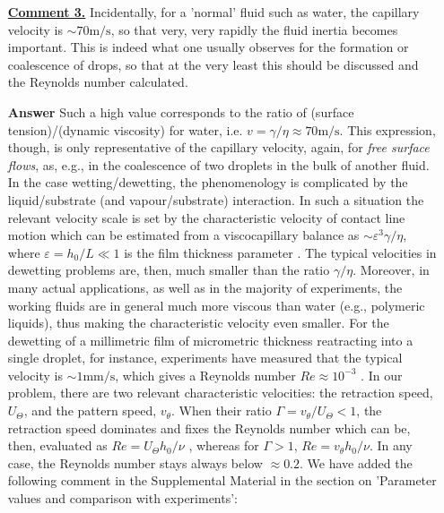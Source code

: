 \documentclass[12pt,english]{article}
\begin{document}
\begin{itemize}
{}

\item[ \textbf{\underline{Comment 3.}}]
{ 
Incidentally, for a 'normal' fluid such as water, the capillary velocity is $\sim 70\mbox{m}/\mbox{s}$, 
so that very, very rapidly the fluid inertia becomes important. 
This is indeed what one usually observes for the formation or coalescence of drops, so that at the very least this should be discussed and the Reynolds number calculated.
}

\item[ \textbf{{Answer}}]
{
Such a high value corresponds to the ratio of (surface tension)/(dynamic viscosity) for water, i.e. $v = \gamma/\eta \approx 70 \mbox{m}/\mbox{s}$.
This expression, though, is only representative of the capillary velocity, again, for {\it free surface flows}, as, e.g., in the coalescence of 
two droplets in the bulk of another fluid. 
In the case wetting/dewetting, 
the phenomenology is complicated by the liquid/substrate (and vapour/substrate) interaction. 
In such a situation the relevant velocity scale is set by the characteristic velocity of contact line 
motion which can be estimated from a viscocapillary balance as 
$\sim \varepsilon^3 \gamma/\eta$, where $\varepsilon = h_0/L \ll 1$ is the film thickness parameter 
\cite{RevModPhys.69.931,doi:10.1146/annurev-fluid-011212-140734}. 
The typical velocities in dewetting problems are, then, much smaller than the ratio $\gamma/\eta$.
Moreover, in many actual applications, as well as in the majority of experiments, the 
working fluids are in general much more viscous than water (e.g., polymeric liquids), thus making
the characteristic velocity even smaller.
For the dewetting of a millimetric film of micrometric thickness reatracting into a single droplet, for instance, experiments have measured that 
the typical velocity is $\sim 1 \mbox{mm}/\mbox{s}$, which gives a Reynolds number $Re \approx 10^{-3}$ \cite{Edwards2016}. 
In our problem, there are two relevant characteristic velocities: the retraction speed, 
$U_{\Theta}$, and 
the pattern speed, $v_{\theta}$. When their ratio $\Gamma = v_{\theta}/U_{\Theta} < 1$, the retraction speed dominates and fixes the Reynolds number which can be, then, evaluated as 
$Re = U_{\Theta}h_0/\nu$ \cite{RevModPhys.69.931}, whereas for $\Gamma > 1$, $Re = v_{\theta} h_0/\nu$. 
In any case, the Reynolds number stays always below $\approx 0.2$.
We have added the following comment in the Supplemental Material in the section on 'Parameter values and comparison with experiments':\\

}
\end{itemize}
\end{document}
